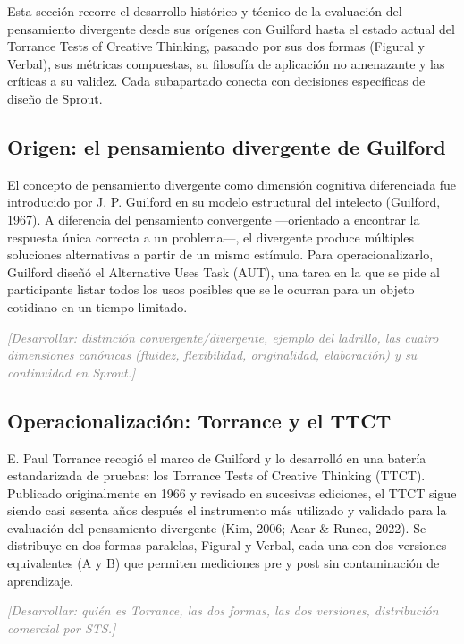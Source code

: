 \documentclass[12pt,twoside,titlepage]{report}
\begin{document}
Esta sección recorre el desarrollo histórico y técnico de la evaluación del pensamiento divergente desde sus orígenes con Guilford hasta el estado actual del Torrance Tests of Creative Thinking, pasando por sus dos formas (Figural y Verbal), sus métricas compuestas, su filosofía de aplicación no amenazante y las críticas a su validez. Cada subapartado conecta con decisiones específicas de diseño de Sprout.

\subsection{Origen: el pensamiento divergente de Guilford}

El concepto de pensamiento divergente como dimensión cognitiva diferenciada fue introducido por J. P. Guilford en su modelo estructural del intelecto (Guilford, 1967). A diferencia del pensamiento convergente ---orientado a encontrar la respuesta única correcta a un problema---, el divergente produce múltiples soluciones alternativas a partir de un mismo estímulo. Para operacionalizarlo, Guilford diseñó el Alternative Uses Task (AUT), una tarea en la que se pide al participante listar todos los usos posibles que se le ocurran para un objeto cotidiano en un tiempo limitado.

\textcolor{gray}{\textit{[Desarrollar: distinción convergente/divergente, ejemplo del ladrillo, las cuatro dimensiones canónicas (fluidez, flexibilidad, originalidad, elaboración) y su continuidad en Sprout.]}}

\subsection{Operacionalización: Torrance y el TTCT}

E. Paul Torrance recogió el marco de Guilford y lo desarrolló en una batería estandarizada de pruebas: los Torrance Tests of Creative Thinking (TTCT). Publicado originalmente en 1966 y revisado en sucesivas ediciones, el TTCT sigue siendo casi sesenta años después el instrumento más utilizado y validado para la evaluación del pensamiento divergente (Kim, 2006; Acar \& Runco, 2022). Se distribuye en dos formas paralelas, Figural y Verbal, cada una con dos versiones equivalentes (A y B) que permiten mediciones pre y post sin contaminación de aprendizaje.

\textcolor{gray}{\textit{[Desarrollar: quién es Torrance, las dos formas, las dos versiones, distribución comercial por STS.]}}
\end{document}
